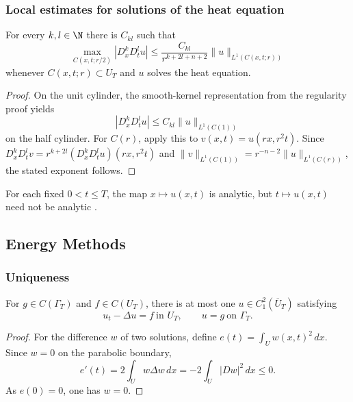 \subsubsection{Local estimates for solutions of the heat equation}
\label{sec:heat-local-estimates}

\begin{theorem}
\label{thm:heat-equation-derivative-estimates}
For every $k,l\in\N$ there is $C_{kl}$ such that
$$\max_{C(x,t;r/2)}|D_x^kD_t^lu|
\le\frac{C_{kl}}{r^{k+2l+n+2}}
\|u\|_{L^1(C(x,t;r))}$$
whenever $C(x,t;r)\subset U_T$ and $u$ solves the heat equation.
\end{theorem}
\begin{proof}
\sketch On the unit cylinder, the smooth-kernel representation from the
regularity proof yields
$$|D_x^kD_t^lu|\le C_{kl}\|u\|_{L^1(C(1))}$$
on the half cylinder. For $C(r)$, apply this to $v(x,t)=u(rx,r^2t)$. Since
$D_x^kD_t^lv=r^{k+2l}(D_x^kD_t^lu)(rx,r^2t)$ and
$\|v\|_{L^1(C(1))}=r^{-n-2}\|u\|_{L^1(C(r))}$, the stated exponent follows.
\end{proof}

\begin{remark}
\label{rem:heat-equation-spatial-analyticity}
For each fixed $0<t\le T$, the map $x\mapsto u(x,t)$ is analytic, but
$t\mapsto u(x,t)$ need not be analytic \cite{Mikhailov1978}.
\end{remark}

\subsection{Energy Methods}
\label{sec:heat-energy-methods}

\subsubsection{Uniqueness}
\label{sec:heat-energy-uniqueness}

\begin{theorem}
\label{thm:uniqueness-heat-energy-method}
\leanok
{}
For $g\in C(\Gamma_T)$ and $f\in C(U_T)$, there is at most one
$u\in C_1^2(\overline U_T)$ satisfying
$$u_t-\Delta u=f\ \text{in }U_T,
\qquad
u=g\ \text{on }\Gamma_T.$$
\end{theorem}
\begin{proof}
\leanok
\sketch For the difference $w$ of two solutions, define
$e(t)=\int_Uw(x,t)^2\,dx$. Since $w=0$ on the parabolic boundary,
$$e'(t)=2\int_Uw\Delta w\,dx=-2\int_U|Dw|^2\,dx\le0.$$
As $e(0)=0$, one has $w=0$.
\end{proof}

